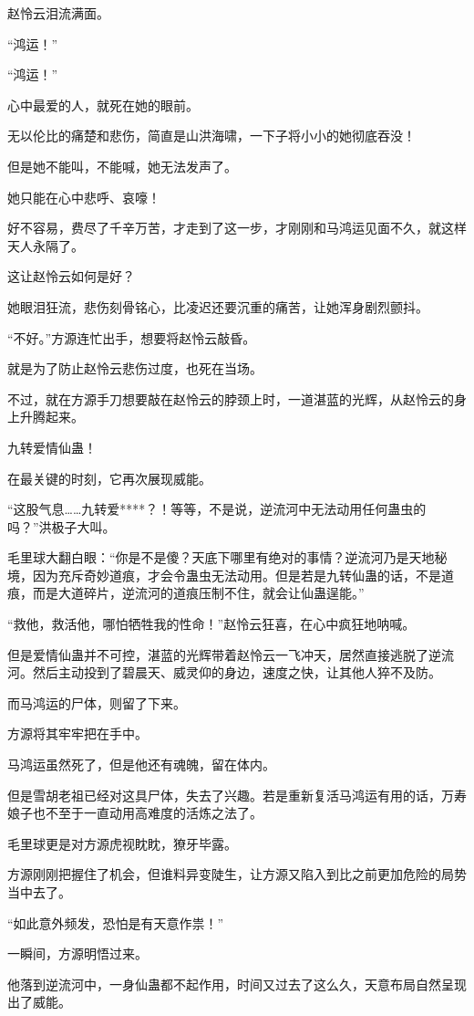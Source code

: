 \begin{this_body}
赵怜云泪流满面。

“鸿运！”

“鸿运！”

心中最爱的人，就死在她的眼前。

无以伦比的痛楚和悲伤，简直是山洪海啸，一下子将小小的她彻底吞没！

但是她不能叫，不能喊，她无法发声了。

她只能在心中悲呼、哀嚎！

好不容易，费尽了千辛万苦，才走到了这一步，才刚刚和马鸿运见面不久，就这样天人永隔了。

这让赵怜云如何是好？

她眼泪狂流，悲伤刻骨铭心，比凌迟还要沉重的痛苦，让她浑身剧烈颤抖。

“不好。”方源连忙出手，想要将赵怜云敲昏。

就是为了防止赵怜云悲伤过度，也死在当场。

不过，就在方源手刀想要敲在赵怜云的脖颈上时，一道湛蓝的光辉，从赵怜云的身上升腾起来。

九转爱情仙蛊！

在最关键的时刻，它再次展现威能。

“这股气息……九转爱****？！等等，不是说，逆流河中无法动用任何蛊虫的吗？”洪极子大叫。

毛里球大翻白眼：“你是不是傻？天底下哪里有绝对的事情？逆流河乃是天地秘境，因为充斥奇妙道痕，才会令蛊虫无法动用。但是若是九转仙蛊的话，不是道痕，而是大道碎片，逆流河的道痕压制不住，就会让仙蛊逞能。”

“救他，救活他，哪怕牺牲我的性命！”赵怜云狂喜，在心中疯狂地呐喊。

但是爱情仙蛊并不可控，湛蓝的光辉带着赵怜云一飞冲天，居然直接逃脱了逆流河。然后主动投到了碧晨天、威灵仰的身边，速度之快，让其他人猝不及防。

而马鸿运的尸体，则留了下来。

方源将其牢牢把在手中。

马鸿运虽然死了，但是他还有魂魄，留在体内。

但是雪胡老祖已经对这具尸体，失去了兴趣。若是重新复活马鸿运有用的话，万寿娘子也不至于一直动用高难度的活炼之法了。

毛里球更是对方源虎视眈眈，獠牙毕露。

方源刚刚把握住了机会，但谁料异变陡生，让方源又陷入到比之前更加危险的局势当中去了。

“如此意外频发，恐怕是有天意作祟！”

一瞬间，方源明悟过来。

他落到逆流河中，一身仙蛊都不起作用，时间又过去了这么久，天意布局自然呈现出了威能。


\end{this_body}
